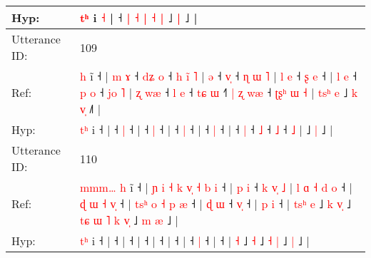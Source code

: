 \documentclass[10pt]{article}
\DeclareRobustCommand{\hl}[1]{{\textcolor{red}{#1}}}
\begin{document}
\begin{longtable}{ll}
 \\
Hyp: & \hl{}\hl{}\hl{}\hl{}\hl{}\hl{}\hl{}\hl{}\hl{}\hl{}\hl{}\hl{}\hl{}\hl{}\hl{t}\hl{ʰ} i\hl{} \hl{˧} |\hl{}\hl{}\hl{}\hl{}\hl{} ˧ \hl{}\hl{|} \hl{˧} \hl{|} \hl{˧} \hl{}\hl{|} ˩\hl{}\hl{} \hl{|} ˩ |
 \\
\midrule
Utterance ID: & 109 \\
Ref: & \hl{}\hl{h} i\hl{̃} ˧ |\hl{ }\hl{m}\hl{ }\hl{ɤ} ˧\hl{ }\hl{d}\hl{ʑ} \hl{o} ˧\hl{ }\hl{h}\hl{ }\hl{i}\hl{̃}\hl{ }\hl{˥} |\hl{ }\hl{ə} ˧ \hl{v}\hl{̩} ˧\hl{ }\hl{ɳ}\hl{ }\hl{ɯ}\hl{ }\hl{˥} |\hl{ }\hl{l}\hl{ }\hl{e} ˧\hl{ }\hl{ʂ} \hl{e} ˧ |\hl{ }\hl{l}\hl{ }\hl{e} ˧\hl{ }\hl{p} \hl{o} ˧\hl{ }\hl{j}\hl{o}\hl{ }\hl{˥} |\hl{ }\hl{ʐ}\hl{ }\hl{w}\hl{æ} ˧\hl{ }\hl{l} \hl{e} ˧\hl{ }\hl{t}\hl{ɕ} \hl{ɯ} ˧\hl{˥}\hl{ }\hl{|}\hl{ }\hl{ʐ} \hl{w}\hl{æ} ˧\hl{ }\hl{ʈ}\hl{ʂ}\hl{ʰ}\hl{ }\hl{ɯ} \hl{˧} |\hl{ }\hl{t}\hl{s}\hl{ʰ}\hl{ }\hl{e} ˩\hl{ }\hl{k} \hl{v}\hl{̩} ˩\hl{˥} |
 \\
Hyp: & \hl{t}\hl{ʰ} i\hl{} ˧ |\hl{}\hl{}\hl{}\hl{} ˧\hl{}\hl{}\hl{} \hl{|} ˧\hl{}\hl{}\hl{}\hl{}\hl{}\hl{}\hl{} |\hl{}\hl{} ˧ \hl{}\hl{|} ˧\hl{}\hl{}\hl{}\hl{}\hl{}\hl{} |\hl{}\hl{}\hl{}\hl{} ˧\hl{}\hl{} \hl{|} ˧ |\hl{}\hl{}\hl{}\hl{} ˧\hl{}\hl{} \hl{|} ˧\hl{}\hl{}\hl{}\hl{}\hl{} |\hl{}\hl{}\hl{}\hl{}\hl{} ˧\hl{}\hl{} \hl{|} ˧\hl{}\hl{}\hl{} \hl{˩} ˧\hl{}\hl{}\hl{}\hl{}\hl{} \hl{}\hl{˩} ˧\hl{}\hl{}\hl{}\hl{}\hl{}\hl{} \hl{˩} |\hl{}\hl{}\hl{}\hl{}\hl{}\hl{} ˩\hl{}\hl{} \hl{}\hl{|} ˩\hl{} |
 \\
\midrule
Utterance ID: & 110 \\
Ref: & \hl{m}\hl{m}\hl{m}\hl{…}\hl{ }\hl{h} i\hl{̃} ˧ |\hl{ }\hl{ɲ}\hl{ }\hl{i}\hl{ }\hl{˧}\hl{ }\hl{k}\hl{ }\hl{v}\hl{̩}\hl{ }\hl{˧}\hl{ }\hl{b}\hl{ }\hl{i} ˧ |\hl{ }\hl{p}\hl{ }\hl{i} ˧\hl{ }\hl{k}\hl{ }\hl{v}\hl{̩}\hl{ }\hl{˩} |\hl{ }\hl{l}\hl{ }\hl{ɑ}\hl{ }\hl{˧}\hl{ }\hl{d}\hl{ }\hl{o} ˧ |\hl{ }\hl{ɖ}\hl{ }\hl{ɯ}\hl{ }\hl{˧}\hl{ }\hl{v}\hl{̩} ˧ |\hl{ }\hl{t}\hl{s}\hl{ʰ}\hl{ }\hl{o}\hl{ }\hl{˧}\hl{ }\hl{p}\hl{ }\hl{æ} ˧ |\hl{ }\hl{ɖ}\hl{ }\hl{ɯ} ˧ \hl{v}\hl{̩} ˧ |\hl{ }\hl{p}\hl{ }\hl{i} ˧ |\hl{ }\hl{t}\hl{s}\hl{ʰ} \hl{e} ˩\hl{ }\hl{k} \hl{v}\hl{̩} ˩\hl{ }\hl{t}\hl{ɕ}\hl{ }\hl{ɯ}\hl{ }\hl{˥} \hl{k} \hl{v}\hl{̩} ˩\hl{ }\hl{m} \hl{æ} ˩ |
 \\
Hyp: & \hl{}\hl{}\hl{}\hl{}\hl{t}\hl{ʰ} i\hl{} ˧ |\hl{}\hl{}\hl{}\hl{}\hl{}\hl{}\hl{}\hl{}\hl{}\hl{}\hl{}\hl{}\hl{}\hl{}\hl{}\hl{}\hl{} ˧ |\hl{}\hl{}\hl{}\hl{} ˧\hl{}\hl{}\hl{}\hl{}\hl{}\hl{}\hl{} |\hl{}\hl{}\hl{}\hl{}\hl{}\hl{}\hl{}\hl{}\hl{}\hl{} ˧ |\hl{}\hl{}\hl{}\hl{}\hl{}\hl{}\hl{}\hl{}\hl{} ˧ |\hl{}\hl{}\hl{}\hl{}\hl{}\hl{}\hl{}\hl{}\hl{}\hl{}\hl{}\hl{} ˧ |\hl{}\hl{}\hl{}\hl{} ˧ \hl{}\hl{|} ˧ |\hl{}\hl{}\hl{}\hl{} ˧ |\hl{}\hl{}\hl{}\hl{} \hl{˧} ˩\hl{}\hl{} \hl{}\hl{˧} ˩\hl{}\hl{}\hl{}\hl{}\hl{}\hl{}\hl{} \hl{˧} \hl{}\hl{|} ˩\hl{}\hl{} \hl{|} ˩ |

\end{longtable}
\end{document}
